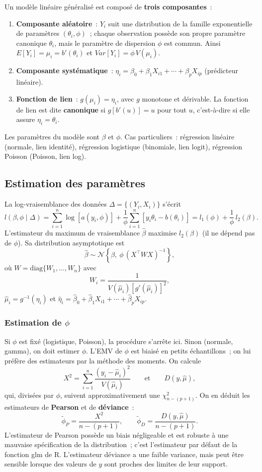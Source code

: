 \documentclass[11pt,letterpaper]{article}
\begin{document}
Un modèle linéaire généralisé est composé de \textbf{trois composantes}~:
\begin{enumerate}
\item \textbf{Composante aléatoire}~: $Y_i$ suit une distribution de la famille exponentielle de paramètres $(\theta_i, \phi)$~; chaque observation possède son propre paramètre canonique $\theta_i$, mais le paramètre de dispersion $\phi$ est commun. Ainsi $E[Y_i] = \mu_i = b'(\theta_i)$ et $Var[Y_i] = \phi\, V(\mu_i)$.
\item \textbf{Composante systématique}~: $\eta_i = \beta_0 + \beta_1 X_{i1} + \cdots + \beta_p X_{ip}$ (prédicteur linéaire).
\item \textbf{Fonction de lien}~: $g(\mu_i) = \eta_i$, avec $g$ monotone et dérivable. La fonction de lien est dite \textbf{canonique} si $g[b'(u)] = u$ pour tout $u$, c'est-à-dire si elle assure $\eta_i = \theta_i$.
\end{enumerate}
Les paramètres du modèle sont $\beta$ et $\phi$. Cas particuliers~: régression linéaire (normale, lien identité), régression logistique (binomiale, lien logit), régression Poisson (Poisson, lien log).

\subsection{Estimation des paramètres}

La log-vraisemblance des données $\Delta = \{(Y_i,X_i)\}$ s'écrit
$$l(\beta,\phi\mid\Delta) = \sum_{i=1}^n\log[a(y_i,\phi)] + \frac{1}{\phi}\sum_{i=1}^n[y_i\theta_i - b(\theta_i)] = l_1(\phi) + \frac{1}{\phi}\, l_2(\beta).$$
L'estimateur du maximum de vraisemblance $\hat\beta$ maximise $l_2(\beta)$ (il ne dépend pas de $\phi$). Sa distribution asymptotique est
$$\hat\beta \sim \mathcal{N}\left\{\beta,\ \phi\,(X^\top W X)^{-1}\right\},$$
où $W = \mathrm{diag}\{W_1,\ldots,W_n\}$ avec
$$W_i = \frac{1}{V(\hat\mu_i)\left[g'(\hat\mu_i)\right]^2},$$
$\hat\mu_i = g^{-1}(\hat\eta_i)$ et $\hat\eta_i = \hat\beta_0 + \hat\beta_1 X_{i1} + \cdots + \hat\beta_p X_{ip}$.

\subsubsection{Estimation de $\phi$}

Si $\phi$ est fixé (logistique, Poisson), la procédure s'arrête ici. Sinon (normale, gamma), on doit estimer $\phi$. L'EMV de $\phi$ est biaisé en petits échantillons~; on lui préfère des estimateurs par la méthode des moments. On calcule
$$X^2 = \sum_{i=1}^n\frac{(y_i - \hat\mu_i)^2}{V(\hat\mu_i)} \qquad\mbox{et}\qquad D(y,\hat\mu),$$
qui, divisées par $\phi$, suivent approximativement une $\chi^2_{n-(p+1)}$. On en déduit les estimateurs de \textbf{Pearson} et de \textbf{déviance}~:
$$\tilde\phi_P = \frac{X^2}{n-(p+1)}, \qquad \tilde\phi_D = \frac{D(y,\hat\mu)}{n-(p+1)}.$$
L'estimateur de Pearson possède un biais négligeable et est robuste à une mauvaise spécification de la distribution~; c'est l'estimateur par défaut de la fonction \textsf{glm} de \textrm{R}. L'estimateur déviance a une faible variance, mais peut être sensible lorsque des valeurs de $y$ sont proches des limites de leur support.
\end{document}
